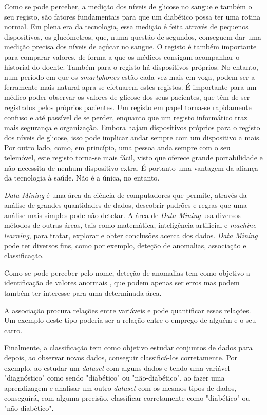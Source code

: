 Como se pode perceber, a medição dos níveis de glicose no sangue e também o seu registo, são fatores fundamentais para que um diabético possa ter uma rotina normal. Em plena era da tecnologia, essa medição é feita através de pequenos dispositivos, os glucómetros, que, numa questão de segundos, conseguem dar uma medição precisa dos níveis de açúcar no sangue. O registo é também importante para comparar valores, de forma a que os médicos consigam acompanhar o historial do doente. Também para o registo há dispositivos próprios. No entanto, num período em que os \textit{smartphones} estão cada vez mais em voga, podem ser a ferramente mais natural apra se efetuarem estes registos. É importante para um médico poder observar os valores de glicose dos seus pacientes, que têm de ser registados pelos próprios pacientes. Um registo em papel torna-se rapidamente confuso e até passível de se perder, enquanto que um registo informático traz mais segurança e organização. Embora hajam dispositivos próprios para o registo dos níveis de glicose, isso pode implicar andar sempre com um dispositivo a mais. Por outro lado, como, em princípio, uma pessoa anda sempre com o seu telemóvel, este registo torna-se mais fácil, visto que oferece grande portabilidade e não necessita de nenhum dispositivo extra. É portanto uma vantagem da aliança da tecnologia à saúde. Não é a única, no entanto.

\textit{Data Mining} é uma área da ciência de computadores que permite, através da análise de grandes quantidades de dados, descobrir padrões e regras que uma análise mais simples pode não detetar. A área de \textit{Data Mining} usa diversos métodos de outras áreas, tais como matemática, inteligência artificial e \textit{machine learning}, para tratar, explorar e obter conclusões acerca dos dados. \textit{Data Mining} pode ter diversos fins, como por exemplo,  deteção de anomalias, associação e classificação.

Como se pode perceber pelo nome, deteção de anomalias tem como objetivo a identificação de valores anormais , que podem apenas ser erros mas podem também ter interesse para uma determinada área.

A associação procura relações entre variáveis e pode quantificar essas relações. Um exemplo deste tipo poderia ser a relação entre o emprego de alguém e o seu carro.

Finalmente, a classificação tem como objetivo estudar conjuntos de dados para depois, ao observar novos dados, conseguir classificá-los corretamente. Por exemplo, ao estudar um \textit{dataset} com alguns dados e tendo uma variável "diagnóstico" como sendo "diabético" ou "não-diabético", ao fazer uma aprendizagem e analisar um outro \textit{dataset} com os mesmos tipos de dados, conseguirá, com alguma precisão, classificar corretamente como "diabético" ou "não-diabético".

